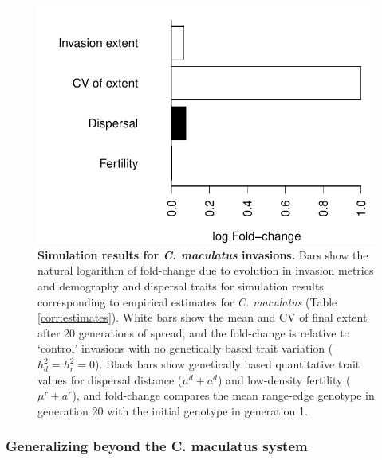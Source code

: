 \documentclass[11pt]{article}
\begin{document}
\begin{figure}[h!]
\centering
\includegraphics[width=0.5\linewidth]{Figures/foldchange_barplot}
\caption{\textbf{Simulation results for \textit{C. maculatus} invasions.} Bars show the natural logarithm of fold-change due to evolution in invasion metrics and demography and dispersal traits for simulation results corresponding to empirical estimates for \textit{C. maculatus} (Table \ref{corr:estimates}).
White bars show the mean and CV of final extent after 20 generations of spread, and the fold-change is relative to `control' invasions with no genetically based trait variation ($h^{2}_{d} = h^{2}_{r} = 0$).
Black bars show genetically based quantitative trait values for dispersal distance ($\mu^{d} + a^{d}$) and low-density fertility ($\mu^{r} + a^{r}$), and fold-change compares the mean range-edge genotype in generation 20 with the initial genotype in generation 1.}
\label{corr:barplot}
\end{figure}

\subsubsection*{Generalizing beyond the \textup{C. maculatus} system}
\end{document}
